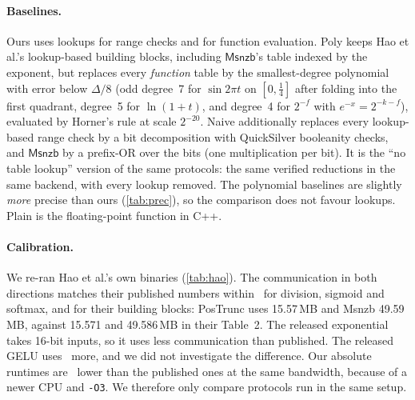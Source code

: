 \documentclass[10pt,twocolumn]{article}
\theoremstyle{remark}
\newcommand{\Msnzb}{\mathsf{Msnzb}}
\newcommand{\ulp}{\Delta}
\begin{document}
\paragraph{Baselines.} \textsf{Ours} uses lookups for range checks and for function evaluation.
\textsf{Poly} keeps Hao et al.'s lookup-based building blocks, including $\Msnzb$'s table indexed by
the exponent, but replaces every \emph{function} table by the smallest-degree polynomial with error
below $\ulp/8$ (odd degree~7 for
$\sin2\pi t$ on $[0,\frac14]$ after folding into the first quadrant, degree~5 for $\ln(1+t)$, and
degree~4 for $2^{-f}$ with $e^{-x}=2^{-k-f}$), evaluated by Horner's rule at scale $2^{-20}$.
\textsf{Naive} additionally replaces every lookup-based range check by a bit decomposition with
QuickSilver booleanity checks, and $\Msnzb$ by a prefix-OR over the bits (one multiplication per
bit). It is the ``no table lookup'' version of the same protocols: the
same verified reductions in the same backend, with every lookup removed. The polynomial baselines
are slightly \emph{more} precise than ours (\cref{tab:prec}), so the comparison does not favour
lookups. \textsf{Plain} is the floating-point function in C++.

\paragraph{Calibration.} We re-ran Hao et al.'s own binaries (\cref{tab:hao}). The communication in
both directions matches their published numbers within \HaoCommDev\ for division, sigmoid and
softmax, and for their building blocks: PosTrunc uses 15.57\,MB and Msnzb 49.59\,MB, against 15.571
and 49.586\,MB in their Table~2. The released exponential takes 16-bit inputs, so it uses less
communication than published. The released GELU uses \HaoGeluDev\ more, and we did not investigate
the difference. Our absolute runtimes are \HaoTimeFactor\ lower than the published ones at the same
bandwidth, because of a newer CPU and \texttt{-O3}. We therefore only compare protocols run in the
same setup.


\end{document}
